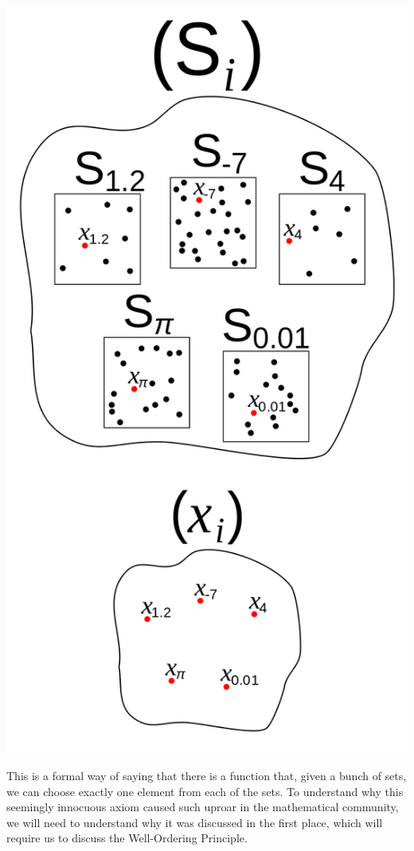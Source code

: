 \documentclass{article}
\begin{document}
\begin{center}
    \includegraphics[scale=0.18]{images/axiom_of_choice.wikipedia.png}
\end{center}

This is a formal way of saying that there is a function that, given a bunch of sets, we can choose exactly one element from each of the sets. To understand why this seemingly innocuous axiom caused such uproar in the mathematical community, we will need to understand why it was discussed in the first place, which will require us to discuss the Well-Ordering Principle. 
\end{document}
